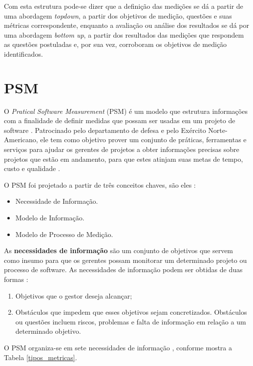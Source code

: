 Com esta estrutura pode-se dizer que a definição das medições se dá a partir de uma abordagem \textit{topdown}, a partir dos objetivos de medição, questões e suas métricas correspondente, enquanto a avaliação ou análise dos resultados se dá por uma abordagem \textit{bottom up}, a partir dos resultados das medições que respondem as questões postuladas e, por sua vez, corroboram os objetivos de medição identificados.

\section{PSM}

O \textit{Pratical Software Measurement} (PSM) é um modelo que estrutura informações com a finalidade de definir medidas que possam ser usadas em um projeto de software . Patrocinado pelo departamento de defesa e pelo Exército Norte-Americano, ele tem como objetivo prover um conjunto de práticas, ferramentas e serviços para ajudar os gerentes de projetos a obter informações precisas sobre projetos que estão em andamento, para que estes atinjam suas metas de tempo, custo e qualidade .	

O PSM foi projetado a partir de três conceitos chaves, são eles \cite{card_jones}:

\begin{itemize}
 \item Necessidade de Informação.
\item Modelo de Informação.
\item Modelo de Processo de Medição.
\end{itemize}

As \textbf{necessidades de informação} são um conjunto de objetivos que servem como insumo para que os gerentes possam monitorar um determinado projeto ou processo de software. As necessidades de informação podem ser obtidas de duas formas \cite{card_jones}:

\begin{enumerate}
 \item Objetivos que o gestor deseja alcançar;
\item Obstáculos que impedem que esses objetivos sejam concretizados. Obstáculos ou questões incluem riscos, problemas e falta de informação em relação a um determinado objetivo.

\end{enumerate}


O PSM organiza-se em sete necessidades de informação \cite{card_jones}, conforme mostra a Tabela \ref{tipos_metricas}.

